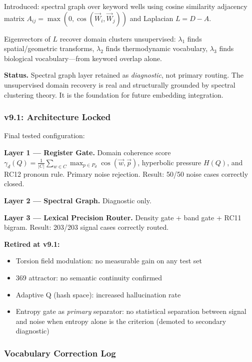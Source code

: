 \documentclass[11pt,twoside]{article}
\begin{document}
Introduced: spectral graph over keyword wells using cosine similarity adjacency matrix
$A_{ij} = \max(0, \cos(\vec{W}_i, \vec{W}_j))$ and Laplacian $L = D - A$.

Eigenvectors of $L$ recover domain clusters unsupervised:
$\lambda_1$ finds spatial/geometric transforms, $\lambda_2$ finds thermodynamic
vocabulary, $\lambda_3$ finds biological vocabulary---from keyword overlap alone.

\begin{confirmedenv}
\textbf{Status.} Spectral graph layer retained as \emph{diagnostic}, not primary
routing. The unsupervised domain recovery is real and structurally grounded by
spectral clustering theory. It is the foundation for future embedding integration.
\end{confirmedenv}

\subsubsection{v9.1: Architecture Locked}

Final tested configuration:

\textbf{Layer 1 --- Register Gate.} Domain coherence score
$\gamma_d(Q) = \frac{1}{|C|}\sum_{w\in C}\max_{p\in P_d}\cos(\vec{w},\vec{p})$,
hyperbolic pressure $H(Q)$, and RC12 pronoun rule. Primary noise rejection.
Result: 50/50 noise cases correctly closed.

\textbf{Layer 2 --- Spectral Graph.} Diagnostic only.

\textbf{Layer 3 --- Lexical Precision Router.} Density gate + band gate + RC11 bigram.
Result: 203/203 signal cases correctly routed.

\begin{retiredenv}
\textbf{Retired at v9.1:}
\begin{itemize}
  \item Torsion field modulation: no measurable gain on any test set
  \item 369 attractor: no semantic continuity confirmed
  \item Adaptive Q (hash space): increased hallucination rate
  \item Entropy gate as \emph{primary} separator: no statistical separation between
        signal and noise when entropy alone is the criterion (demoted to secondary diagnostic)
\end{itemize}
\end{retiredenv}

\subsubsection{Vocabulary Correction Log}
\end{document}
